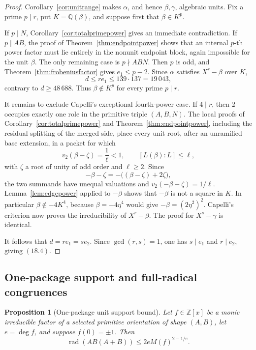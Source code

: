\documentclass[11pt]{article}
\newtheorem{proposition}[theorem]{Proposition}
\theoremstyle{definition}
\newcommand{\Q}{\mathbb Q}
\newcommand{\Z}{\mathbb Z}
\begin{document}
\begin{proof}
Corollary~\ref{cor:unitrange} makes \(\alpha\), and hence \(\beta,\gamma\),
algebraic units.  Fix a prime \(p\mid r\), put \(K=\Q(\beta)\), and suppose
first that \(\beta\in K^p\).

If \(p\mid N\), Corollary~\ref{cor:totalprimepower} gives an immediate
contradiction.  If \(p\mid AB\), the proof of
Theorem~\ref{thm:endpointpower} shows that an internal \(p\)-th power factor
must lie entirely in the nonunit endpoint block, again impossible for the
unit \(\beta\).  The only remaining case is \(p\nmid ABN\).  Then \(p\) is
odd, and Theorem~\ref{thm:frobeniusfactor} gives \(e_1\leq p-2\).  Since
\(\alpha\) satisfies \(X^r-\beta\) over \(K\),
\[
 d\leq re_1\leq139\cdot137=19\,043,
\]
contrary to \(d\geq48\,688\).  Thus \(\beta\notin K^p\) for every
prime \(p\mid r\).

It remains to exclude Capelli's exceptional fourth-power case.  If
\(4\mid r\), then \(2\) occupies exactly one role in the primitive triple
\((A,B,N)\).  The local proofs of Corollary~\ref{cor:totalprimepower} and
Theorem~\ref{thm:endpointpower}, including the residual splitting of the
merged side, place every unit root, after an unramified base extension, in a
packet for which
\[
 v_2(\beta-\zeta)=\frac1\ell<1,
 \qquad [L(\beta):L]\leq\ell,
\]
with \(\zeta\) a root of unity of odd order and \(\ell\geq2\).  Since
\[
 -\beta-\zeta=-\bigl((\beta-\zeta)+2\zeta\bigr),
\]
the two summands have unequal valuations and
\(v_2(-\beta-\zeta)=1/\ell\).  Lemma~\ref{lem:edgepower} applied to
\(-\beta\) shows that \(-\beta\) is not a square in \(K\).  In particular
\(\beta\notin-4K^4\), because
\(\beta=-4\eta^4\) would give \(-\beta=(2\eta^2)^2\).
Capelli's criterion now proves the irreducibility of \(X^r-\beta\).
The proof for \(X^s-\gamma\) is identical.

It follows that \(d=re_1=se_2\).  Since \(\gcd(r,s)=1\), one has
\(s\mid e_1\) and \(r\mid e_2\), giving \((18.4)\).
\end{proof}

\subsection{One-package support and full-radical congruences}

\begin{proposition}[One-package unit support bound]
\label{prop:onepackagesupport}
Let \(f\in\Z[x]\) be a monic irreducible factor of a selected primitive
orientation of shape \((A,B)\), let \(e=\deg f\), and suppose
\(f(0)=\pm1\).  Then
\begin{equation}
 \operatorname{rad}(AB(A+B))
 \leq2eM(f)^{2-1/e}.
 \tag{18.5}
\end{equation}
\end{proposition}
\end{document}
